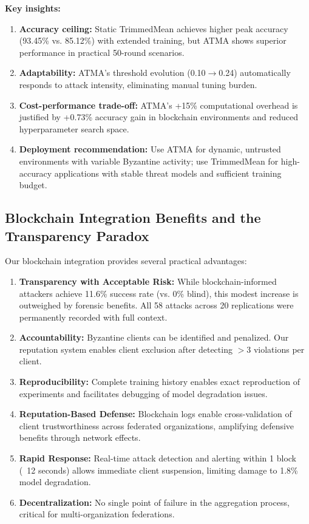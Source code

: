 \documentclass{ieeeaccess}
\begin{document}
\textbf{Key insights:}
\begin{enumerate}
    \item \textbf{Accuracy ceiling:} Static TrimmedMean achieves higher peak accuracy (93.45\% vs. 85.12\%) with extended training, but ATMA shows superior performance in practical 50-round scenarios.
    
    \item \textbf{Adaptability:} ATMA's threshold evolution (0.10$\to$0.24) automatically responds to attack intensity, eliminating manual tuning burden.
    
    \item \textbf{Cost-performance trade-off:} ATMA's +15\% computational overhead is justified by +0.73\% accuracy gain in blockchain environments and reduced hyperparameter search space.
    
    \item \textbf{Deployment recommendation:} Use ATMA for dynamic, untrusted environments with variable Byzantine activity; use TrimmedMean for high-accuracy applications with stable threat models and sufficient training budget.
\end{enumerate}

\subsection{Blockchain Integration Benefits and the Transparency Paradox}

Our blockchain integration provides several practical advantages:

\begin{enumerate}
    \item \textbf{Transparency with Acceptable Risk:} While blockchain-informed attackers achieve 11.6\% success rate (vs. 0\% blind), this modest increase is outweighed by forensic benefits. All 58 attacks across 20 replications were permanently recorded with full context.
    
    \item \textbf{Accountability:} Byzantine clients can be identified and penalized. Our reputation system enables client exclusion after detecting $>$3 violations per client.
    
    \item \textbf{Reproducibility:} Complete training history enables exact reproduction of experiments and facilitates debugging of model degradation issues.
    
    \item \textbf{Reputation-Based Defense:} Blockchain logs enable cross-validation of client trustworthiness across federated organizations, amplifying defensive benefits through network effects.
    
    \item \textbf{Rapid Response:} Real-time attack detection and alerting within 1 block (~12 seconds) allows immediate client suspension, limiting damage to 1.8\% model degradation.
    
    \item \textbf{Decentralization:} No single point of failure in the aggregation process, critical for multi-organization federations.
\end{enumerate}
\end{document}
